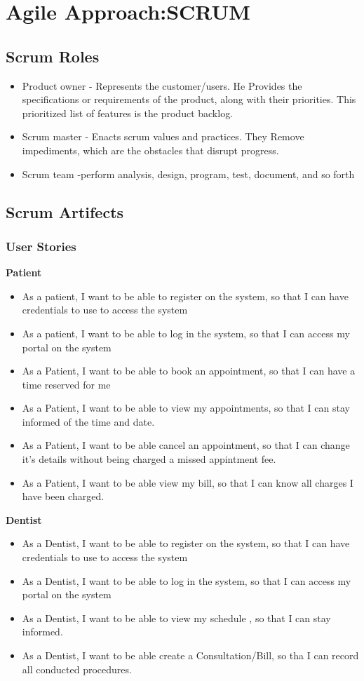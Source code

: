 \documentclass[11 pt]{article}
\begin{document}
  \section{Agile Approach:SCRUM}
\subsection{Scrum Roles}
\begin{itemize}
    \item
    Product owner - Represents the customer/users.  He Provides the specifications or requirements of the product, along with their priorities. This prioritized list of features is the product backlog.
    \item
    Scrum master - Enacts scrum values and practices. They Remove impediments, which are the obstacles that disrupt progress.
    \item
    Scrum team -perform analysis, design, program, test, document, and so forth
    \end{itemize}
  \subsection{Scrum Artifects}
  \subsubsection{User Stories}
  \textbf{Patient}
  \begin{itemize}
  \item
  As a patient, I want to be able to register on the system, so that I can have credentials to use to access the system
  \item
  As a patient, I want to be able to log in the system, so that I can access my portal on the system
  \item
  As a Patient, I want to be able to book an appointment, so that I can 				have a time reserved for me
  \item
  As a Patient, I want to be able to view my appointments, so that I can stay informed of the time and date.
  \item
  As a Patient, I want to be able cancel an appointment, so that I can change it's details without being charged a missed appintment fee.
  \item
  As a Patient, I want to be able view my bill, so that I can know all charges I have been charged.
  \end{itemize}
   \textbf{Dentist}
   \begin{itemize}
    \item
  As a Dentist, I want to be able to register on the system, so that I can have credentials to use to access the system
  \item
  As a Dentist, I want to be able to log in the system, so that I can access my portal on the system
  \item
  As a Dentist, I want to be able to view my schedule , so that I can stay informed.
  \item
  As a Dentist, I want to be able create a Consultation/Bill, so tha I can record all conducted procedures.
   \end{itemize}
   
\end{document}

